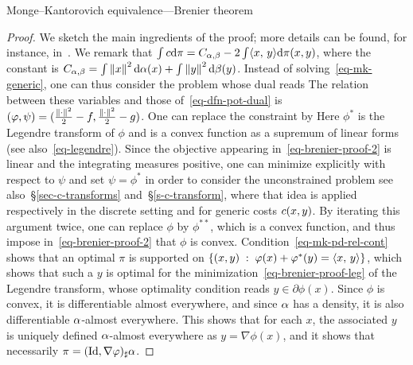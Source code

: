 \begin{rem2}{Monge--Kantorovich equivalence---Brenier theorem}
\begin{proof}
	We sketch the main ingredients of the proof; more details can be found, for instance, in~\citep{SantambrogioBook}.
	We remark that $\int c \mathrm{d}\pi = C_{\alpha,\beta} - 2 \int \langle x,\,y\rangle\mathrm{d}\pi(x,y)$, where the constant is $C_{\alpha,\beta} = \int \left\| x \right\|^2\mathrm{d}\alpha(x) + \int \left\| y \right\|^2\mathrm{d}\beta(y)$. Instead of solving~\eqref{eq-mk-generic}, one can thus consider the problem
	whose dual reads
	The relation between these variables and those of~\eqref{eq-dfn-pot-dual} is
	$(\varphi,\psi) = (\frac{\left\| \cdot \right\|^2}{2}-f,\frac{\left\| \cdot \right\|^2}{2}-g)$.
	One can replace the constraint by
	Here $\phi^*$ is the Legendre transform of $\phi$ and is a convex function as a supremum of linear forms (see also~\eqref{eq-legendre}). Since the objective appearing in~\eqref{eq-brenier-proof-2} is linear and the integrating measures positive, one can minimize explicitly with respect to $\psi$ and set $\psi=\phi^*$ in order to consider the unconstrained problem
	\eql{\label{eq-brenier-proof-2}
		\umin{\phi} \int_\X \phi \d\al + \int_\Y \phi^* \d\be;
	}
	see also~\S\ref{sec-c-transforms} and~\S\ref{s-c-transform}, where that idea is applied respectively in the discrete setting and for generic costs $c(x,y)$.
	By iterating this argument twice, one can replace $\phi$ by $\phi^{**}$, which is a convex function, and thus impose in~\eqref{eq-brenier-proof-2} that $\phi$ is convex.
	Condition~\eqref{eq-mk-pd-rel-cont} shows that an optimal $\pi$ is supported on $\left\{ (x,y) \;:\; \varphi(x)+\varphi^*(y)=\langle x,\,y\rangle \right\}$, which shows that such a $y$ is optimal for the minimization~\eqref{eq-brenier-proof-leg} of the Legendre transform, whose optimality condition reads $y \in \partial \phi(x)$.
	Since $\phi$ is convex, it is differentiable almost everywhere, and since $\alpha$ has a density, it is also differentiable $\alpha$-almost everywhere.
	This shows that for each $x$, the associated $y$ is uniquely defined $\alpha$-almost everywhere as $y = \nabla\phi(x)$, and it shows that necessarily $\pi = (\mathrm{Id},\nabla\varphi)_\sharp \alpha$.
\end{proof}


\end{rem2}
